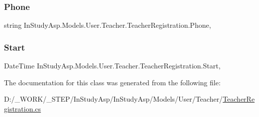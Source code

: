 \subsubsection{\texorpdfstring{Phone}{Phone}}
{\footnotesize\ttfamily string In\+Study\+Asp.\+Models.\+User.\+Teacher.\+Teacher\+Registration.\+Phone\hspace{0.3cm}{\ttfamily [get]}, {\ttfamily [set]}}

\mbox{\label{class_in_study_asp_1_1_models_1_1_user_1_1_teacher_1_1_teacher_registration_a4a3c193dddb92594f9ad5cd24040dbb3}} 
\subsubsection{\texorpdfstring{Start}{Start}}
{\footnotesize\ttfamily Date\+Time In\+Study\+Asp.\+Models.\+User.\+Teacher.\+Teacher\+Registration.\+Start\hspace{0.3cm}{\ttfamily [get]}, {\ttfamily [set]}}



The documentation for this class was generated from the following file\+:\begin{DoxyCompactItemize}
\item 
D\+:/\+\_\+\+W\+O\+R\+K/\+\_\+\+S\+T\+E\+P/\+In\+Study\+Asp/\+In\+Study\+Asp/\+Models/\+User/\+Teacher/\hyperlink{_teacher_registration_8cs}{Teacher\+Registration.\+cs}\end{DoxyCompactItemize}
